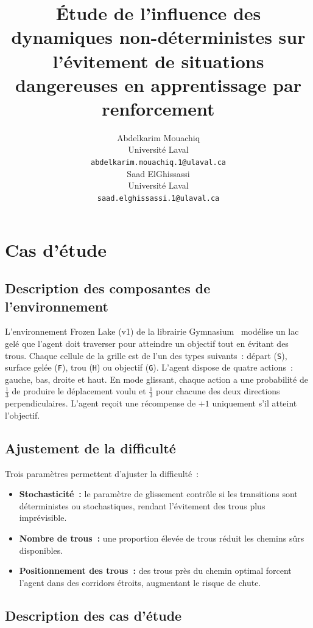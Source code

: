 \documentclass{article}
\title{Étude de l'influence des dynamiques non-déterministes sur l'évitement de situations dangereuses en apprentissage par renforcement}
\author{
  Abdelkarim Mouachiq \\
  Université Laval \\
  \texttt{abdelkarim.mouachiq.1@ulaval.ca} \\
  \And
  Saad ElGhissassi \\
  Université Laval \\
  \texttt{saad.elghissassi.1@ulaval.ca} \\
}
\begin{document}
\maketitle

\section{Cas d'étude}

\subsection{Description des composantes de l'environnement}

L'environnement Frozen Lake (v1) de la librairie Gymnasium~\cite{towers2024gymnasium} modélise un lac gelé que l'agent doit traverser pour atteindre un objectif tout en évitant des trous. Chaque cellule de la grille est de l'un des types suivants~: départ (\texttt{S}), surface gelée (\texttt{F}), trou (\texttt{H}) ou objectif (\texttt{G}). L'agent dispose de quatre actions~: gauche, bas, droite et haut. En mode glissant, chaque action a une probabilité de $\frac{1}{3}$ de produire le déplacement voulu et $\frac{1}{3}$ pour chacune des deux directions perpendiculaires. L'agent reçoit une récompense de $+1$ uniquement s'il atteint l'objectif.

\subsection{Ajustement de la difficulté}

Trois paramètres permettent d'ajuster la difficulté~:
\begin{itemize}
    \item \textbf{Stochasticité~:} le paramètre de glissement contrôle si les transitions sont déterministes ou stochastiques, rendant l'évitement des trous plus imprévisible.
    \item \textbf{Nombre de trous~:} une proportion élevée de trous réduit les chemins sûrs disponibles.
    \item \textbf{Positionnement des trous~:} des trous près du chemin optimal forcent l'agent dans des corridors étroits, augmentant le risque de chute.
\end{itemize}

\subsection{Description des cas d'étude}
\end{document}
